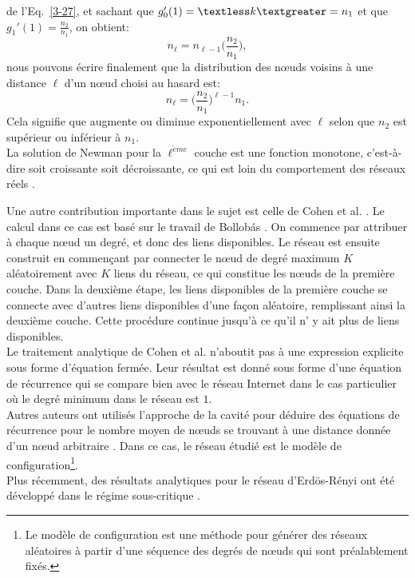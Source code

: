 de l'Eq.~\eqref{3-27}, et sachant que $g_0'(1)=\km=n_1$ et que $g_1'(1)=\frac{n_2}{n_1}$, on obtient: 
\begin{equation}
n_{\ell}=n_{\ell-1}\Big(\frac{n_2}{n_1}\Big),
\end{equation}
nous pouvons écrire finalement que la distribution des nœuds voisins à une distance $\ell$ d'un nœud choisi au hasard est:
\begin{equation}
 n_{\ell}=\Big(\frac{n_2}{n_1}\Big)^{\ell-1}n_1.
\end{equation} 
Cela signifie que \nl augmente ou diminue exponentiellement avec $\ell$ selon que $n_2$ est supérieur ou inférieur à $n_1$.\\
La solution de Newman pour la $\ell^{\grave eme}$ couche est une fonction monotone, c'est-à-dire soit croissante soit décroissante, ce qui est loin du comportement des réseaux réels \cite{Cohen-Havlinl2010}.

Une autre contribution importante dans le sujet est celle de Cohen et al. \cite{Cohen-Havlinl2010-72,Kalisky-al2006}. Le calcul dans ce cas est basé sur le travail de Bollobás \cite{Bollobas1985}. On commence par attribuer à chaque nœud un degré, et donc des liens disponibles. Le réseau est ensuite construit en commençant par connecter le nœud de degré maximum $K$ aléatoirement avec $K$ liens du réseau, ce qui constitue les nœuds de la première couche. Dans la deuxième étape, les liens disponibles de la première couche se connecte avec d'autres liens disponibles d'une façon aléatoire, remplissant ainsi la deuxième couche. Cette procédure continue jusqu'à ce qu'il n' y ait plus de liens disponibles.\\
Le traitement analytique de Cohen et al. n'aboutit pas à une expression explicite sous forme d'équation fermée. Leur résultat est donné sous forme d'une équation de récurrence qui se compare bien avec le réseau Internet dans le cas particulier où le degré minimum dans le réseau est $1$.\\
Autres auteurs ont utilisés l'approche de la cavité pour déduire des équations de récurrence pour le nombre moyen de nœuds se trouvant à une distance donnée d'un nœud arbitraire \cite{Nitzan2016}. Dans ce cas, le réseau étudié est le modèle de configuration\footnote{Le modèle de configuration est une méthode pour générer des réseaux aléatoires à partir d'une séquence des degrés de nœuds qui sont préalablement fixés.}.\\
Plus récemment, des résultats analytiques pour le réseau d'Erd\"os-R{\'e}nyi ont été développé dans le régime sous-critique \cite{Katzav-al2015, Katzav-al2018}.
